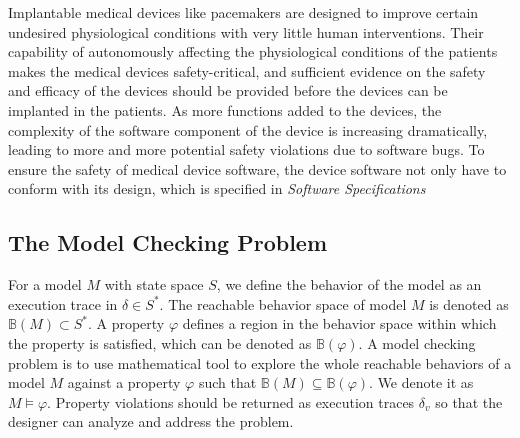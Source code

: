 \documentclass{llncs}
\begin{document}
Implantable medical devices like pacemakers are designed to improve certain undesired physiological conditions with very little human interventions. Their capability of autonomously affecting the physiological conditions of the patients makes the medical devices safety-critical, and sufficient evidence on the safety and efficacy of the devices should be provided before the devices can be implanted in the patients. As more functions added to the devices, the complexity of the software component of the device is increasing dramatically, leading to more and more potential safety violations due to software bugs. To ensure the safety of medical device software, the device software not only have to conform with its design, which is specified in \emph{Software Specifications}
\subsection{The Model Checking Problem}
For a model $M$ with state space $S$, we define the behavior of the model as an execution trace in $\delta\in S^*$. The reachable behavior space of model $M$ is denoted as $\mathbb{B}(M)\subset S^*$. A property $\varphi$ defines a region in the behavior space within which the property is satisfied, which can be denoted as $\mathbb{B}(\varphi)$. A model checking problem is to use mathematical tool to explore the whole reachable behaviors of a model $M$ against a property $\varphi$ such that $\mathbb{B}(M)\subseteq \mathbb{B}(\varphi)$. We denote it as $M\models\varphi$. Property violations should be returned as execution traces $\delta_v$ so that the designer can analyze and address the problem. 
\end{document}
